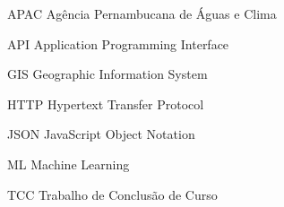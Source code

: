 \listoffigures*
\cleardoublepage

\listoftables*
\cleardoublepage


\begin{siglas}
    \item[APAC] Agência Pernambucana de Águas e Clima
    \item[API] Application Programming Interface
    \item[GIS] Geographic Information System
    \item[HTTP] Hypertext Transfer Protocol
    \item[JSON] JavaScript Object Notation
    \item[ML] Machine Learning
    \item[TCC] Trabalho de Conclusão de Curso
\end{siglas}

\cleardoublepage
